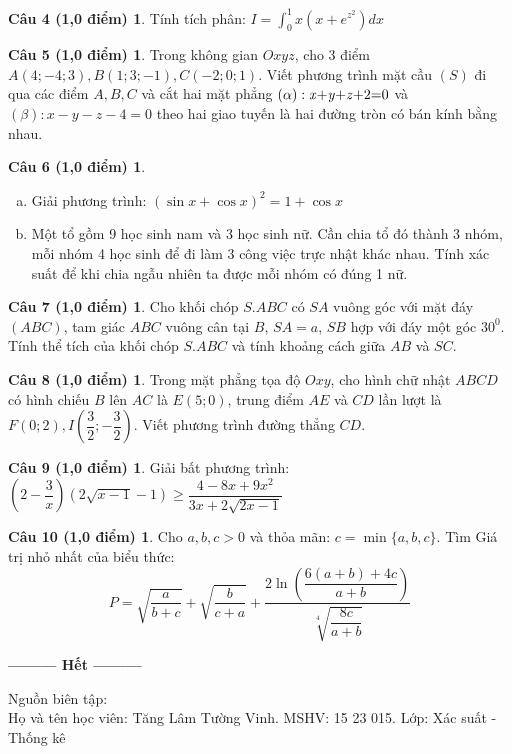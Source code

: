 \documentclass[12pt,a4paper,openany]{book}
\theoremstyle{definition}
\newtheorem*{cau4}{Câu 4 (1,0 điểm)}
\newtheorem*{cau5}{Câu 5 (1,0 điểm)}
\newtheorem*{cau6}{Câu 6 (1,0 điểm)}
\newtheorem*{cau7}{Câu 7 (1,0 điểm)}
\newtheorem*{cau8}{Câu 8 (1,0 điểm)}
\newtheorem*{cau9}{Câu 9 (1,0 điểm)}
\newtheorem*{cau10}{Câu 10 (1,0 điểm)}
\begin{document}
\begin{cau4}  Tính tích phân: $I=\int_{0}^{1} x\left(x+e^{z^2}\right)dx$
\end{cau4}
\begin{cau5} Trong không gian $Oxyz$, cho 3 điểm $A(4;-4;3), B(1;3;-1), C(-2;0;1)$. Viết phương trình mặt cầu $(S)$ đi qua các điểm $A, B, C$ và cắt hai mặt phẳng $(\alpha): \mbox{\textit{x}+\textit{y}+\textit{z}+2=0}$ và $(\beta): x-y-z-4=0$ theo hai giao tuyến là hai đường tròn có bán kính bằng nhau.
\end{cau5}
\begin{cau6}~
	\begin{enumerate}[a)]
		\item Giải phương trình: $(\sin x+\cos x)^2=1+\cos x$
		\item Một tổ gồm 9 học sinh nam và 3 học sinh nữ. Cần chia tổ đó thành 3 nhóm, mỗi nhóm 4 học sinh để đi làm 3 công việc trực nhật khác nhau. Tính xác suất để khi chia ngẫu nhiên ta được mỗi nhóm có đúng 1 nữ.
	\end{enumerate}
\end{cau6}
\begin{cau7} Cho khối chóp $S.ABC$ có $SA$ vuông góc với mặt đáy $(ABC)$, tam giác $ABC$ vuông cân tại $B$, $SA=a$, $SB$ hợp với đáy một góc $30^0$. Tính thể tích của khối chóp $S.ABC$ và tính khoảng cách giữa $AB$ và $SC$.
\end{cau7}

\begin{cau8}
	Trong mặt phẳng tọa độ $Oxy$, cho hình chữ nhật $ABCD$ có hình chiếu $B$ lên $AC$ là $E(5;0)$, trung điểm $AE$ và $CD$ lần lượt là $F(0;2), I\left(\dfrac{3}{2};-\dfrac{3}{2}\right)$. Viết phương trình đường thẳng $CD$.
\end{cau8}

\begin{cau9}
	Giải bất phương trình: $\left(2-\dfrac{3}{x}\right)\left(2\sqrt{x-1}-1\right) \geq \dfrac{4-8x+9x^2}{3x+2\sqrt{2x-1}}$
\end{cau9}

\begin{cau10}
	Cho $a, b, c>0$ và thỏa mãn: $c=\min\{a,b,c\}$. Tìm Giá trị nhỏ nhất của biểu thức:
	\[
	P=\sqrt{\dfrac{a}{b+c}}+\sqrt{\dfrac{b}{c+a}}+\dfrac{2\ln\left( \dfrac{6(a+b)+4c}{a+b}\right)}{\sqrt[4]{\dfrac{8c}{a+b}}}
	\]
\end{cau10}
\begin{center}
	\textbf{--------- Hết ---------}
\end{center}


\noindent
Nguồn biên tập:\dotfill\\
Họ và tên học viên: Tăng Lâm Tường Vinh. MSHV: 15 23 015. Lớp: Xác suất - Thống kê\dotfill
\end{document}
